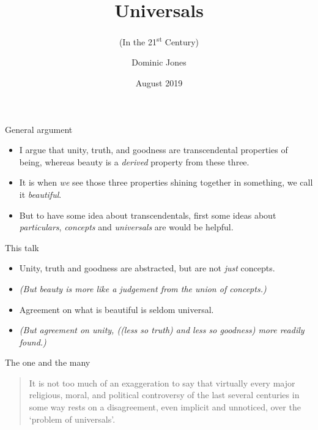 \documentclass[xcolor=dvipsnames]{beamer}
\title{Universals}
\subtitle{(In the 21\textsuperscript{st} Century)}
\author{Dominic Jones}
\date{\small{August 2019}}
\institute{\small{University of Buckingham}}
\begin{document}
\begin{frame}[plain]
  \titlepage
\end{frame}


\begin{frame}[fragile]{General argument}
  \begin{itemize}
  \item I argue that unity, truth, and goodness are transcendental properties of being, whereas beauty is a \emph{derived} property from these three.\vspace{5mm}
  \item It is when \emph{we} see those three properties shining together in something, we call it \emph{beautiful}.\vspace{5mm}
  \item But to have some idea about transcendentals, first some ideas about \emph{particulars}, \emph{concepts} and \emph{universals} are would be helpful.
  \end{itemize}
\end{frame}


\begin{frame}[fragile]{This talk}
  \begin{itemize}
  \item Unity, truth and goodness are abstracted, but are not \emph{just} concepts.\vspace{5mm}
  \item \emph{(But beauty is more like a judgement from the union of concepts.)}\vspace{5mm}
  \item Agreement on what is beautiful is seldom universal. \vspace{5mm}
  \item \emph{(But agreement on unity, ((less so truth) and less so goodness) more readily found.)}\vspace{5mm}
  \end{itemize}
\end{frame}




\begin{frame}{The one and the many}
  \begin{quote}
    {It is not too much of an exaggeration to say that virtually every major religious, moral, and political controversy of the last several centuries in some way rests on a disagreement, even implicit and unnoticed, over the `problem of universals'.}
  \end{quote}
      \hspace*{8cm}{Edward Feser}
\end{frame}
\end{document}
